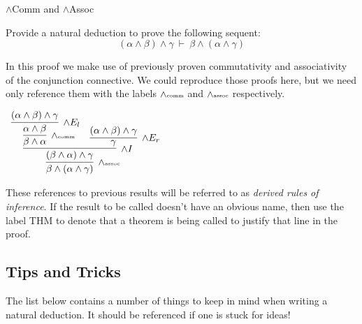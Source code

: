 \documentclass{book}
\begin{document}
    \begin{eg}{$\land$Comm and $\land$Assoc}

        Provide a natural deduction to prove the following sequent: $$(\alpha \land \beta) \land \gamma \ \vdash \ \beta \land (\alpha \land \gamma)$$

        In this proof we make use of previously proven commutativity and associativity of the conjunction connective. We could reproduce those proofs here, but we need only reference them with the labels $\land \textnormal{\tiny{comm}}$ and $\land \textnormal{\tiny{assoc}}$ respectively. 

        \begin{center}
            $\begin{array}{c}
                \infer[\land \textnormal{\tiny{assoc}}]{\beta \land (\alpha \land \gamma)}
                    {\infer[\land I]{(\beta \land \alpha) \land \gamma}
                        {\infer[\land \textnormal{\tiny{comm}}]{\beta \land \alpha}
                            {\infer[\land E_{l}]{\alpha \land \beta}
                                {(\alpha \land \beta) \land \gamma}}
                        &
                        \infer[\land E_{r}]{\gamma}
                            {(\alpha \land \beta) \land \gamma}}}
            \end{array}$
        \end{center}
        
    \end{eg}

    These references to previous results will be referred to as \emph{derived rules of inference}. If the result to be called doesn't have an obvious name, then use the label THM to denote that a theorem is being called to justify that line in the proof. 


    \newpage
    \subsection*{Tips and Tricks}
    
    The list below contains a number of things to keep in mind when writing a natural deduction. It should be referenced if one is stuck for ideas! 
\end{document}
